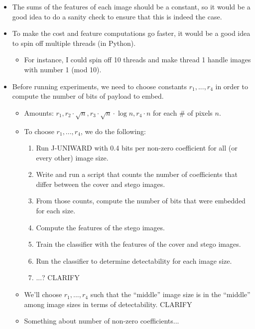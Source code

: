 \documentclass[11pt,a4paper]{report}
\begin{document}
\begin{itemize}
\item The sums of the features of each image should be a constant, so it would be a good idea to do a sanity check to ensure that this is indeed the case.

\item To make the cost and feature computations go faster, it would be a good idea to spin off multiple threads (in Python).
  \begin{itemize}
  \item For instance, I could spin off 10 threads and make thread 1 handle images with number 1 (mod 10).
  \end{itemize}

\item Before running experiments, we need to choose constants $r_1, ... , r_4$ in order to compute the number of bits of payload to embed.
  \begin{itemize}
  \item Amounts: $r_1, r_2 \cdot \sqrt{n}, r_3 \cdot \sqrt{n} \cdot \log n, r_4 \cdot n$ for each \# of pixels $n$.
  \item To choose $r_1, ... , r_4$, we do the following:
    \begin{enumerate}
    \item Run J-UNIWARD with 0.4 bits per non-zero coefficient for all (or every other) image size.
    \item Write and run a script that counts the number of coefficients that differ between the cover and stego images.
    \item From those counts, compute the number of bits that were embedded for each size.
    \item Compute the features of the stego images.
    \item Train the classifier with the features of the cover and stego images.
    \item Run the classifier to determine detectability for each image size.
    \item ...? CLARIFY
    \end{enumerate}
  \item We'll choose $r_1, ... , r_4$ such that the ``middle'' image size is in the ``middle'' among image sizes in terms of detectability. CLARIFY
  \item Something about number of non-zero coefficients...
  \end{itemize}

\end{itemize}
\end{document}
